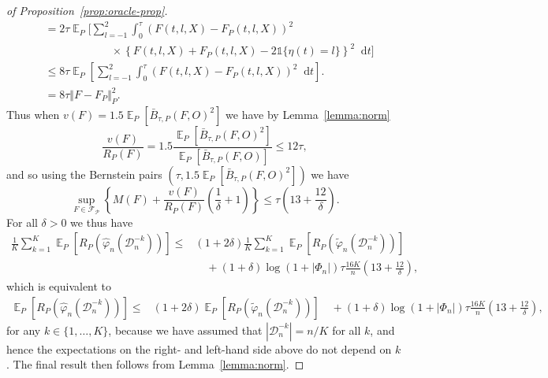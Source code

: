 \documentclass[alpha-refs]{wiley-article}
\DeclareMathOperator{\E}{\mathbb{E}} %
\renewcommand{\phi}{\varphi}
\newcommand*\diff{\mathop{}\!\mathrm{d}}
\newcommand{\1}{\mathds{1}}
\newcommand{\data}{\ensuremath{\mathcal{D}}}
\begin{document}
\begin{proof}[of Proposition~\ref{prop:oracle-prop}]
\begin{align*}
  & =2\tau
    \E_{P}\Bigg[
    \sum_{l=-1}^{2} \int_0^{\tau}
    \left(
    F(t, l, X) - F_P(t, l, X)
    \right)^2
  \\
  & \quad \quad \quad\quad \quad \quad \times
    \left\{
    F(t, l, X) +  F_P(t, l, X)-2 \1{\{\eta(t) = l\}}
    \right\}^2
    \diff t 
    \Bigg]
  \\
  & \leq
    8\tau \E_{P}{\left[
    \sum_{l=-1}^{2} \int_0^{\tau}
    \left(
    F(t, l, X) - F_P(t, l, X)
    \right)^2
    \diff t 
    \right]}.
  \\
  & =
    8\tau \Vert F - F_P \Vert_{P}^2.
\end{align*}
Thus when \( v(F) = 1.5 \E_P{[\bar{B}_{\tau,P}(F, O)^2]} \) we have by
Lemma~\ref{lemma:norm}
\begin{equation*}
  \frac{v(F)}{R_P(F)}
  = 1.5 \frac{\E_P{[\bar{B}_{\tau,P}(F, O)^2]}}{\E_P{[\bar{B}_{\tau,P}(F, O)]}}
  \leq 12 \tau,
\end{equation*}
and so using the Bernstein pairs \( (\tau, 1.5 \E_P{[\bar{B}_{\tau,P}(F, O)^2]}) \) we have
\begin{equation*}
  \sup_{F \in \mathcal{F}_{\mathcal{P}}}
  \left\{
    M(F) + \frac{v(F)}{R_P(F)}
    \left(
      \frac{1}{\delta} + 1
    \right)
  \right\}
  \leq \tau
  \left(
    13 + \frac{12}{\delta}
  \right).
\end{equation*}
For all $\delta>0$ we thus have
\begin{align*}
  \frac{1}{K} \sum_{k=1}^{K} \E_{P}{\left[ R_P(\hat{\phi}_n(\data_n^{-k})) \right]}
  \leq
  &(1+2\delta)\frac{1}{K} \sum_{k=1}^{K}\E_{P}{\left[ R_P(\tilde{\phi}_n(\data_n^{-k})) \right]}
  \\
  & \quad
    + (1+\delta)\log(1 + |\Phi_n|) \tau \frac{16 K}{n}
    \left(
    13 + \frac{12}{\delta}
    \right),
\end{align*}
which is equivalent to
\begin{align*}
   \E_{P}{\left[ R_P(\hat{\phi}_n(\data_n^{-k})) \right]}
  \leq
  &(1+2\delta) \E_{P}{\left[ R_P(\tilde{\phi}_n(\data_n^{-k})) \right]}
    \quad
    + (1+\delta)\log(1 + |\Phi_n|) \tau \frac{16 K}{n}
    \left(
    13 + \frac{12}{\delta}
    \right),
\end{align*}
for any \( k\in \{1, \dots, K\} \), because we have assumed that
\( |\data_n^{-k}| = n/K \) for all \( k \), and hence the expectations
on the right- and left-hand side above do not depend on \( k \). The
final result then follows from Lemma~\ref{lemma:norm}.
\end{proof}
\end{document}

